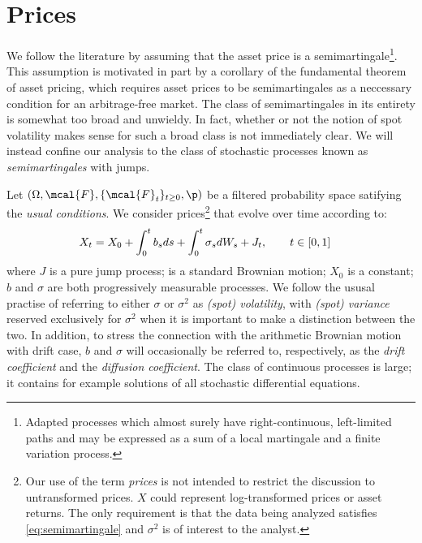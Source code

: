 
\section{Prices} \label{sec:model}
We follow the literature by assuming that the asset price is a semimartingale\footnote{Adapted processes which almost surely have  right-continuous, left-limited paths and  may be expressed as a sum of a local martingale and a finite variation process.}. This assumption is motivated in part by a corollary of  the fundamental theorem of asset pricing, which requires asset prices to be semimartingales as a neccessary   condition for an arbitrage-free market. The class of semimartingales in its entirety  is somewhat too broad and  unwieldy. In fact, whether or not the notion of spot volatility makes sense for such a broad class is not immediately clear. We will instead confine our analysis to the class of stochastic processes known as  \emph{\ito  semimartingales} with \levy jumps.


Let $(\Omega, \mcal{F}, \{\mcal{F}_t\}_{t \ge 0}, \p)$ be a filtered probability space satifying the \emph{usual conditions}. We consider prices\footnote{Our use of the term \emph{prices}  is not intended to restrict the  discussion  to untransformed prices. $X$ could  represent log-transformed prices or asset returns. The only requirement is that the data being analyzed   satisfies \eqref{eq:semimartingale} and $\sigma^2$ is of interest to the analyst.}    
 that evolve over time according to:
\begin{align}
  X_t & = X_0 + \int_0^t b_s d s + \int_0^t \sigma_s d W_s   + J_t, \qquad t \in [0,1]  
  \label{eq:semimartingale}
\end{align}
where $J$ is a pure jump \levy  process; \sbm is a standard Brownian motion;  $X_0$ is a constant;   $b$ and $\sigma$  are both progressively measurable  processes. We follow the ususal practise of referring to either $\sigma$ or $\sigma^2$  as \emph{(spot) volatility}, with \emph{(spot) variance} reserved exclusively for $\sigma^2$ when it is important to make a  distinction between the two. In addition, to stress the connection with the arithmetic Brownian motion with drift case, $b$ and $\sigma$ will occasionally be referred to, respectively, as the \emph{drift coefficient} and the \emph{diffusion coefficient}. 
 The class of continuous \ito processes is large; it contains for example   solutions of all stochastic differential equations.


